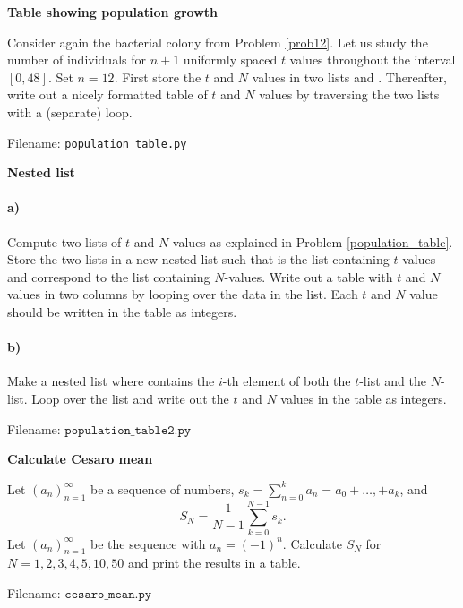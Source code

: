 	
	

\begin{Problem}{\textbf{Table showing population growth}} \label{population_table}

\noindent Consider again the bacterial colony from Problem \ref{prob12}. Let us study the number
of individuals for $n + 1$ uniformly spaced $t$ values throughout the interval
$[0, 48]$. Set $n = 12$. First store the $t$ and $N$ values in two lists 
and . Thereafter, write out a nicely formatted table of $t$ and $N$
values by traversing the two lists with a (separate)   loop. 

Filename: \texttt{population\_table.py}	
\end{Problem}	
	
\begin{Problem}{\textbf{Nested list}}\label{population_table2}

\paragraph{a)} Compute two lists of $t$ and $N$ values as explained in Problem
\ref{population_table}. Store the two lists in a new nested list  such that
 is the list containing $t$-values and  correspond to the list containing $N$-values. Write out a table
with $t$ and $N$ values in two columns by looping over the data in the 
list. Each $t$ and $N$ value should be written in the table as integers. 

\paragraph{b)} Make a nested list  where  contains the $i$-th element of both the $t$-list and the $N$-list. Loop over the  list and write out the $t$ and $N$
values in the table as integers. 


Filename: $\texttt{population\_table2.py}$	
\end{Problem}

\begin{Problem}{\textbf{Calculate Cesaro mean}}

\noindent Let $(a_n)_{n=1}^\infty$ be a sequence of numbers, $s_k=\sum_{n=0}^k a_n=a_0+\dots,+a_k$,
and
\begin{equation*}
    S_N = \frac{1}{N-1}\sum_{k=0}^{N-1} s_k.
\end{equation*}
Let $(a_n)_{n=1}^\infty$ be the sequence with $a_n=(-1)^n$.
Calculate $S_N$ for \newline $N=1, 2, 3, 4, 5, 10, 50$ and print the results in a table.

Filename: $\texttt{cesaro\_mean.py}$
\end{Problem}

